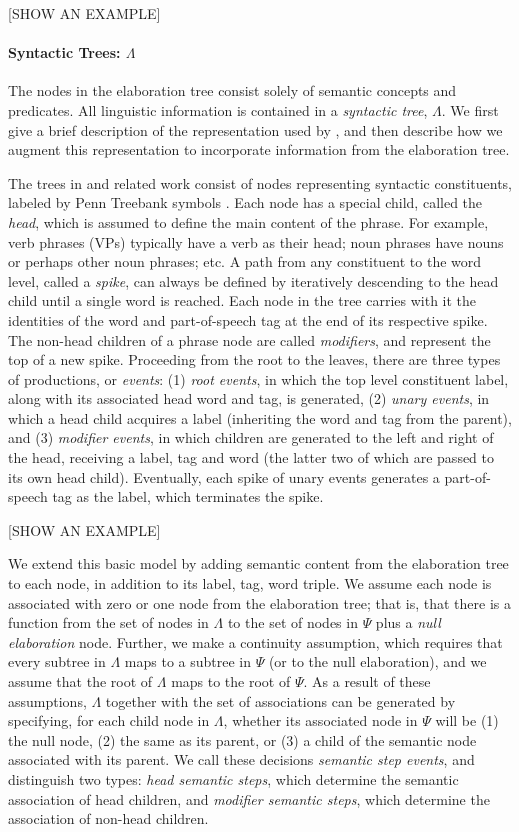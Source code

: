 \documentclass[12pt,letterpaper]{report}
\begin{document}
[SHOW AN EXAMPLE]

\paragraph{Syntactic Trees: $\Lambda$}

The nodes in the elaboration tree consist solely of semantic concepts
and predicates.  All linguistic information is contained in a
{\em syntactic tree}, $\Lambda$.  We first give a brief description of
the representation used by \cite{collins2003head}, and then describe
how we augment this representation to incorporate information from the
elaboration tree.

The trees in \cite{collins2003head} and related work consist of nodes
representing syntactic constituents, labeled by Penn Treebank symbols
\citep{marcus1993building}.  Each node has a special child, called the
{\em head}, which is assumed to define the main content of the phrase.
For example, verb phrases (VPs) typically have a verb as their head; noun
phrases have nouns or perhaps other noun phrases; etc.  A path from
any constituent to the word level, called a {\em spike}, 
can always be defined by iteratively descending to the head child 
until a single word is reached.  Each node in the tree carries with it
the identities of the word and part-of-speech tag at the end of its
respective spike.  The non-head children of a phrase node are called
{\em modifiers}, and represent the top of a new spike.  Proceeding
from the root to the leaves, there are three types of productions, or
{\em events}:
(1) {\em root events}, in which the top level constituent label,
along with its associated head word and tag, is generated, (2) {\em
  unary events}, in which a head child acquires a label (inheriting
the word and tag from the parent), and (3) {\em modifier events}, in
which children are generated to the left and right of the head,
receiving a label, tag and word (the latter two of which are passed to
its own head child).  Eventually, each spike of unary events generates
a part-of-speech tag as the label, which terminates the spike.

[SHOW AN EXAMPLE]

We extend this basic model by adding semantic content from the
elaboration tree to each node, in addition to its label, tag, word
triple.  We assume each node is associated with zero or one node from
the elaboration tree; that is, that there is a function from the set
of nodes in $\Lambda$ to the set of nodes in $\Psi$ plus a {\em null
  elaboration} node.  Further, we make a continuity assumption, which
requires that every subtree in $\Lambda$ maps to a subtree
in $\Psi$ (or to the null elaboration), 
and we assume that the root of $\Lambda$ maps to the root of $\Psi$.
As a result of these assumptions, $\Lambda$ together with the set of
associations can be generated by specifying, for each child node in
$\Lambda$, whether its associated node in $\Psi$ will be (1) the null
node, (2) the same as its parent, or (3) a child of the semantic
node associated with its parent.  We call these decisions {\em
semantic step events}, and distinguish two types: {\em head semantic
steps}, which determine the semantic association of head children,
and {\em modifier semantic steps}, which determine the association of
non-head children.
\end{document}

